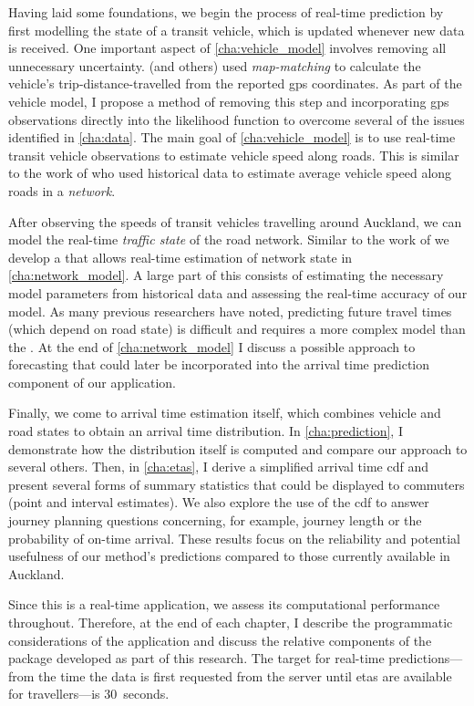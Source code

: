 Having laid some foundations, we begin the process of real-time prediction by first modelling the state of a transit vehicle, which is updated whenever new data is received. One important aspect of \cref{cha:vehicle_model} involves removing all unnecessary uncertainty.  (and others) used \emph{map-matching} to calculate the vehicle's trip-distance-travelled from the reported \gls{gps} coordinates. As part of the vehicle model, I propose a method of removing this step and incorporating \gls{gps} observations directly into the likelihood function to overcome several of the issues identified in \cref{cha:data}. The main goal of \cref{cha:vehicle_model} is to use real-time transit vehicle observations to estimate vehicle speed along roads. This is similar to the work of \citet{Celan_2017,Celan_2018} who used historical data to estimate average vehicle speed along roads in a \emph{network}.


After observing the speeds of transit vehicles travelling around Auckland, we can model the real-time \emph{traffic state} of the road network. Similar to the work of \citet{Shalaby_2004} we develop a \kf{} that allows real-time estimation of network state in \cref{cha:network_model}. A large part of this consists of estimating the necessary model parameters from historical data and assessing the real-time accuracy of our model. As many previous researchers have noted, predicting future travel times (which depend on road state) is difficult and requires a more complex model than the \kf{}. At the end of \cref{cha:network_model} I discuss a possible approach to forecasting that could later be incorporated into the arrival time prediction component of our application.


Finally, we come to arrival time estimation itself, which combines vehicle and road states to obtain an arrival time distribution. In \cref{cha:prediction}, I demonstrate how the distribution itself is computed and compare our approach to several others. Then, in \cref{cha:etas}, I derive a simplified arrival time \gls{cdf} and present several forms of summary statistics that could be displayed to commuters (point and interval estimates).  We also explore the use of the \gls{cdf} to answer journey planning questions concerning, for example, journey length or the probability of on-time arrival. These results focus on the reliability and potential usefulness of our method's predictions compared to those currently available in Auckland.


Since this is a real-time application, we assess its computational performance throughout. Therefore, at the end of each chapter, I describe the programmatic considerations of the application and discuss the relative components of the \Rstats{} package  developed as part of this research. The target for real-time predictions---from the time the data is first requested from the server until \glspl{eta} are available for travellers---is 30~seconds.


